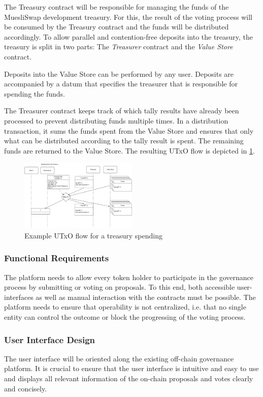 \documentclass[11pt]{article}
\begin{document}
The Treasury contract will be responsible for managing the funds of the MuesliSwap development treasury.
For this, the result of the voting process will be consumed by the Treasury contract and the funds will be distributed accordingly.
To allow parallel and contention-free deposits into the treasury, the treasury is split in two parts:
The \emph{Treasurer} contract and the \emph{Value Store} contract.

Deposits into the Value Store can be performed by any user.
Deposits are accompanied by a datum that specifies the treasurer that is responsible for spending the funds.

The Treasurer contract keeps track of which tally results have already been processed to prevent distributing funds multiple times.
In a distribution transaction, it sums the funds spent from the Value Store and ensures that only what can be distributed according to the tally result is spent.
The remaining funds are returned to the Value Store.
The resulting UTxO flow is depicted in \cref{fig:utxo-flow-treasury}.

\begin{figure}
    \centering
    \includegraphics[width=0.5\textwidth]{figures/spend-from-treasury.pdf}
    \caption{Example UTxO flow for a treasury spending}
    \label{fig:utxo-flow-treasury}
\end{figure}

\subsubsection{Functional Requirements}

The platform needs to allow every token holder to participate in the governance process by submitting or voting on proposals.
To this end, both accessible user-interfaces as well as manual interaction with the contracts must be possible.
The platform needs to ensure that operability is not centralized, i.e. that no single entity can control the outcome or block the progressing of the voting process.

\subsubsection{User Interface Design}
The user interface will be oriented along the existing off-chain governance platform.
It is crucial to ensure that the user interface is intuitive and easy to use and displays all relevant information
of the on-chain proposals and votes clearly and concisely.
\end{document}
